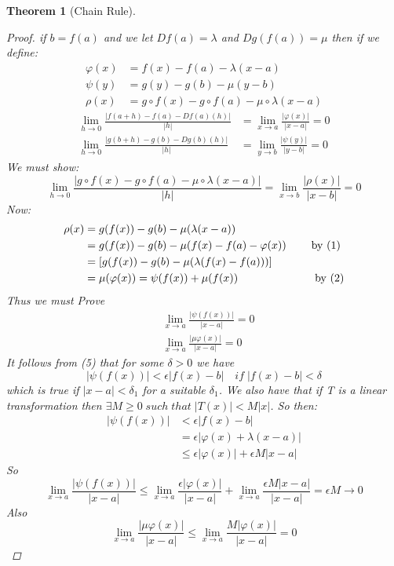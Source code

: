 \documentclass[12pt]{article}
\newtheorem{theorem}{Theorem}[section]
\begin{document}
\begin{theorem}[Chain Rule]
\begin{proof}
if $b=f(a)$ and we let $Df(a) = \lambda$ and $Dg(f(a))=\mu$ then if we define:
\begin{align}
\varphi(x) &=f(x)-f(a) -\lambda(x-a)\\
\psi(y) &= g(y) - g(b) - \mu(y-b)\\
\rho(x) &= g\circ f(x) - g\circ f(a) - \mu \circ \lambda (x -a)
\end{align}
\begin{align}
\lim_{h \to 0}\frac{|f(a+h)-f(a) -Df(a)(h)|}{|h|} &= \lim_{x \to a}\frac{|\varphi(x)|}{|x-a|} = 0\\
\lim_{h \to 0}\frac{|g(b+h)-g(b) -Dg(b)(h)|}{|h|} &= \lim_{y \to b}\frac{|\psi(y)|}{|y-b|} = 0
\end{align}
We must show:
\[\lim_{h \to 0}\frac{|g\circ f(x) - g\circ f(a) - \mu \circ \lambda (x -a)|}{|h|} = \lim_{x \to b}\frac{|\rho(x)|}{|x-b|} = 0\]
Now:
\begin{align*}
\rho(x) &=g(f(x)) - g(b) - \mu(\lambda(x-a)) \\
&= g(f(x)) - g(b) - \mu(f(x) - f(a) - \varphi(x)) \qquad \; \textmd{by (1)}\\
&= [g(f(x)) - g(b) - \mu(\lambda(f(x)-f(a)))] \\
&= \mu(\varphi(x)) = \psi(f(x)) + \mu(f(x)) \qquad \qquad \qquad \quad \textmd{by (2)}
\end{align*}
Thus we must Prove
\begin{align}
&\lim_{x \to a}\frac{|\psi(f(x))|}{|x-a|} = 0\\
&\lim_{x \to a}\frac{|\mu\varphi(x)|}{|x-a|} = 0
\end{align}
It follows from (5) that for some $\delta > 0 $  we have
\[|\psi(f(x))|<\epsilon|f(x) - b| \quad if\; |f(x) - b|<\delta\]
which is true if $|x-a|< \delta_{1} $ for a suitable $\delta_{1}$. We also have that if T is a linear transformation then $\exists M \geq 0\; such \; that\;  |T(x)|<M|x|$. So then:
\begin{align*}
|\psi(f(x))| &<\epsilon|f(x) - b| \\
&= \epsilon|\varphi(x) + \lambda(x-a)|\\
& \leq \epsilon|\varphi(x)| + \epsilon M|x-a|
\end{align*}
So
\[\lim_{x \to a}\frac{|\psi(f(x))|}{|x-a|} \leq \lim_{x \to a}\frac{\epsilon|\varphi(x)|}{|x-a|}  + \lim_{x \to a}\frac{\epsilon M|x-a|}{|x-a|} = \epsilon M \rightarrow 0\]
Also
\[\lim_{x \to a}\frac{|\mu\varphi(x)|}{|x-a|} \leq \lim_{x \to a}\frac{M|\varphi(x)|}{|x-a|} = 0\]
\end{proof}
\end{theorem}
\end{document}
